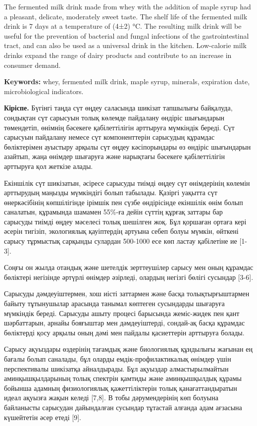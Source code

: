 The fermented milk drink made from whey with the addition of maple syrup
had a pleasant, delicate, moderately sweet taste. The shelf life of the
fermented milk drink is 7 days at a temperature of (4±2) °C. The
resulting milk drink will be useful for the prevention of bacterial and
fungal infections of the gastrointestinal tract, and can also be used as
a universal drink in the kitchen. Low-calorie milk drinks expand the
range of dairy products and contribute to an increase in consumer
demand.

{\bfseries Keywords:} whey, fermented milk drink, maple syrup, minerals,
expiration date, microbiological indicators.

\begin{multicols}{2}
{\bfseries Кіріспе.} Бүгінгі таңда сүт өңдеу саласында шикізат тапшылығы
байқалуда, сондықтан сүт сарысуын толық көлемде пайдалану өндіріс
шығындарын төмендетіп, өнімнің бәсекеге қабілеттілігін арттыруға
мүмкіндік береді. Сүт сарысуын пайдалану немесе сүт компоненттерін
сарысудың құрамдас бөліктерімен ауыстыру арқылы сүт өңдеу кәсіпорындары
өз өндіріс шығындарын азайтып, жаңа өнімдер шығаруға және нарықтағы
бәсекеге қабілеттілігін арттыруға қол жеткізе алады.

Екіншілік сүт шикізатын, әсіресе сарысуды тиімді өңдеу сүт өнімдерінің
көлемін арттырудың маңызды мүмкіндігі болып табылады. Қазіргі уақытта
сүт өнеркәсібінің көпшілігінде ірімшік пен сүзбе өндірісінде екіншілік
өнім болып саналатын, құрамында шамамен 55\%-ға дейін сүттің құрғақ
заттары бар сарысуды тиімді өңдеу мәселесі толық шешілген жоқ. Бұл
қоршаған ортаға кері әсерін тигізіп, экологиялық қауіптердің артуына
себеп болуы мүмкін, өйткені сарысу тұрмыстық сарқынды сулардан 500-1000
есе көп ластау қабілетіне ие {[}1-3{]}.

Соңғы он жылда отандық және шетелдік зерттеушілер сарысу мен оның
құрамдас бөліктері негізінде әртүрлі өнімдер әзірледі, олардың негізгі
бөлігі сусындар {[}3-6{]}.

Сарысуды дәмдеуіштермен, хош иісті заттармен және басқа
толықтырғыштармен байыту тұтынушылар арасында танымал көптеген
сусындарды шығаруға мүмкіндік береді. Сарысуды ашыту процесі барысында
жеміс-жидек пен қант шәрбаттарын, арнайы бояғыштар мен дәмдеуіштерді,
сондай-ақ басқа құрамдас бөліктерді қосу арқылы оның дәмі мен пайдалы
қасиеттерін арттыруға болады.

Сарысу ақуыздары өздерінің тағамдық және биологиялық құндылығы жағынан
ең бағалы болып саналады, бұл оларды емдік-профилактикалық өнімдер үшін
перспективалы шикізатқа айналдырады. Бұл ақуыздар алмастырылмайтын
аминқышқылдарының толық спектрін қамтиды және аминқышқылдық құрамы
бойынша адамның физиологиялық қажеттіліктерін толық қанағаттандыратын
идеал ақуызға жақын келеді {[}7,8{]}. В тобы дәрумендерінің көп болуына
байланысты сарысудан дайындалған сусындар тұтастай алғанда адам ағзасына
күшейтетін әсер етеді {[}9{]}.


\end{multicols}
